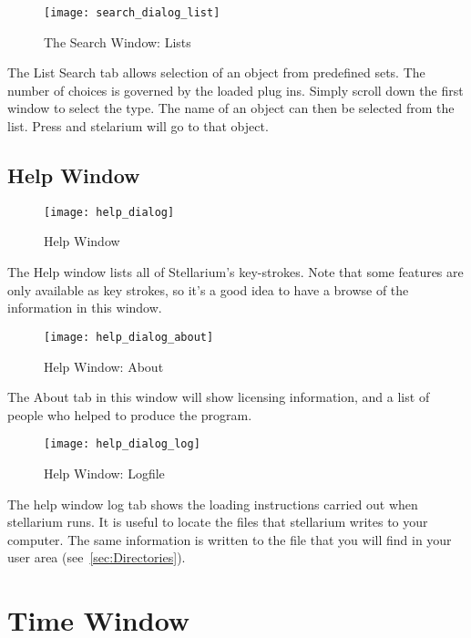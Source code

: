 \begin{figure}[h]
\centering\texttt{[image: search\_dialog\_list]}
\caption{The Search Window: Lists}
\label{fig:interface:search:position}
\end{figure}

The List Search tab allows selection of an object from predefined
sets.  The number of choices is governed by the loaded plug
ins. Simply scroll down the first window to select the type. The name
of an object can then be selected from the list. Press  and
stelarium will go to that object.

\subsection{Help Window}

\begin{figure}[h]
\centering\texttt{[image: help\_dialog]}
\caption{Help Window}
\label{fig:interface:help}
\end{figure}

The Help window lists all of Stellarium's key-strokes. Note that some
features are only available as key strokes, so it's a good idea to have
a browse of the information in this window.

\begin{figure}[h]
\centering\texttt{[image: help\_dialog\_about]}
\caption{Help Window: About}
\label{fig:interface:help:about}
\end{figure}

The About tab in this window will show licensing information, and a list
of people who helped to produce the program.

\begin{figure}[h]
\centering\texttt{[image: help\_dialog\_log]}
\caption{Help Window: Logfile}
\label{fig:interface:help:log}
\end{figure}

The help window log tab shows the loading instructions carried out when
stellarium runs. It is useful to locate the files that stellarium writes
to your computer. The same information is written to  the file  that you will
find in your user area (see~\ref{sec:Directories}).

\section{Time Window}

